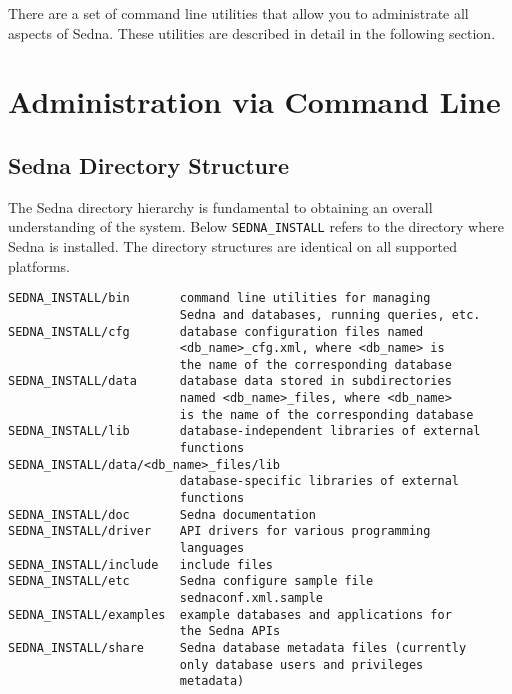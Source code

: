 \documentclass[a4paper,12pt]{article}
\begin{document}
There are a set of command line utilities that allow you to administrate all
aspects of Sedna. These utilities are described in detail in the following
section.


\section{Administration via Command Line}
\subsection{Sedna Directory Structure}
\label{sec:dir-structure}

The Sedna directory hierarchy is fundamental to obtaining an overall
understanding of the system. Below \verb!SEDNA_INSTALL! refers to the directory
where Sedna is installed. The directory structures are identical on all
supported platforms.

\small{
\begin{verbatim}
SEDNA_INSTALL/bin       command line utilities for managing
                        Sedna and databases, running queries, etc.
SEDNA_INSTALL/cfg       database configuration files named
                        <db_name>_cfg.xml, where <db_name> is
                        the name of the corresponding database
SEDNA_INSTALL/data      database data stored in subdirectories
                        named <db_name>_files, where <db_name>
                        is the name of the corresponding database
SEDNA_INSTALL/lib       database-independent libraries of external
                        functions
SEDNA_INSTALL/data/<db_name>_files/lib
                        database-specific libraries of external
                        functions
SEDNA_INSTALL/doc       Sedna documentation
SEDNA_INSTALL/driver    API drivers for various programming
                        languages
SEDNA_INSTALL/include   include files
SEDNA_INSTALL/etc       Sedna configure sample file
                        sednaconf.xml.sample
SEDNA_INSTALL/examples  example databases and applications for
                        the Sedna APIs
SEDNA_INSTALL/share     Sedna database metadata files (currently
                        only database users and privileges
                        metadata)
\end{verbatim}}
\end{document}
